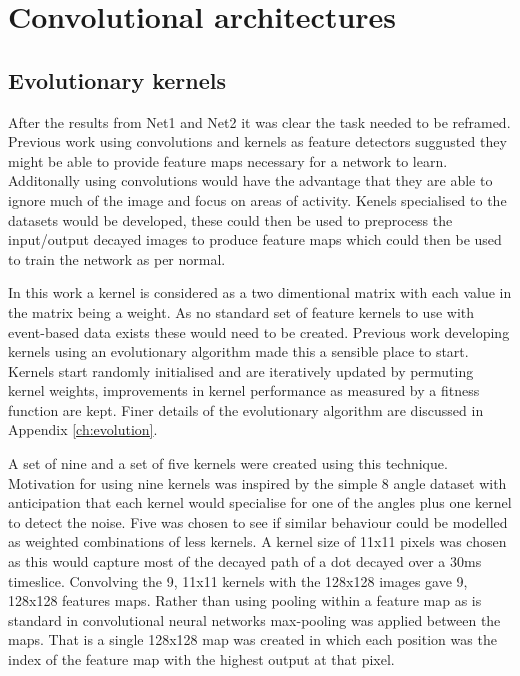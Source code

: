 \chapter{Convolutional architectures}

\section{Evolutionary kernels}
After the results from Net1 and Net2 it was clear the task needed to be reframed.
Previous work using convolutions and kernels as feature detectors suggusted they might be able to provide feature maps necessary for a network to learn.
Additonally using convolutions would have the advantage that they are able to ignore much of the image and focus on areas of activity.  
Kenels specialised to the datasets would be developed, these could then be used to preprocess the input/output decayed images to produce feature maps which could then be used to train the network as per normal.


In this work a kernel is considered as a two dimentional matrix with each value in the matrix being a weight.
As no standard set of feature kernels to use with event-based data exists these would need to be created.
Previous work developing kernels using an evolutionary algorithm made this a sensible place to start.
Kernels start randomly initialised and are iteratively updated by permuting kernel weights, improvements in kernel performance as measured by a fitness function are kept.
Finer details of the evolutionary algorithm are discussed in Appendix \ref{ch:evolution}.

A set of nine and a set of five kernels were created using this technique.
Motivation for using nine kernels was inspired by the simple 8 angle dataset with anticipation that each kernel would specialise for one of the angles plus one kernel to detect the noise.
Five was chosen to see if similar behaviour could be modelled as weighted combinations of less kernels.
A kernel size of 11x11 pixels was chosen as this would capture most of the decayed path of a dot decayed over a 30ms timeslice.
Convolving the 9, 11x11 kernels with the 128x128 images gave 9, 128x128 features maps.
Rather than using pooling within a feature map as is standard in convolutional neural networks max-pooling was applied between the maps. 
That is a single 128x128 map was created in which each position was the index of the feature map with the highest output at that pixel.

